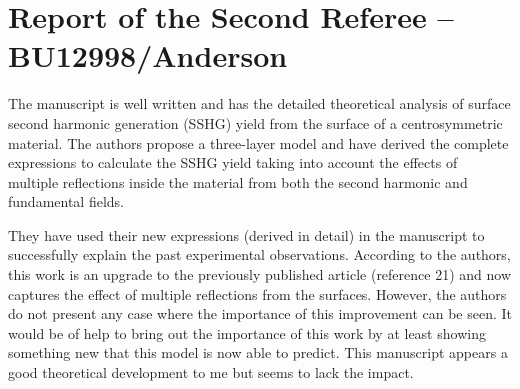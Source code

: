\documentclass[11pt]{article}
\begin{document}
\section{Report of the Second Referee -- BU12998/Anderson}

The manuscript is well written and has the detailed theoretical analysis of
surface second harmonic generation (SSHG) yield from the surface of a
centrosymmetric material. The authors propose a three-layer model and have
derived the complete expressions to calculate the SSHG yield taking into account
the effects of multiple reflections inside the material from both the second
harmonic and fundamental fields.

They have used their new expressions (derived in detail) in the manuscript to
successfully explain the past experimental observations. According to the
authors, this work is an upgrade to the previously published article (reference
21) and now captures the effect of multiple reflections from the surfaces.
However, the authors do not present any case where the importance of this
improvement can be seen. It would be of help to bring out the importance of this
work by at least showing something new that this model is now able to predict.
This manuscript appears a good theoretical development to me but seems to lack
the impact.
\end{document}
